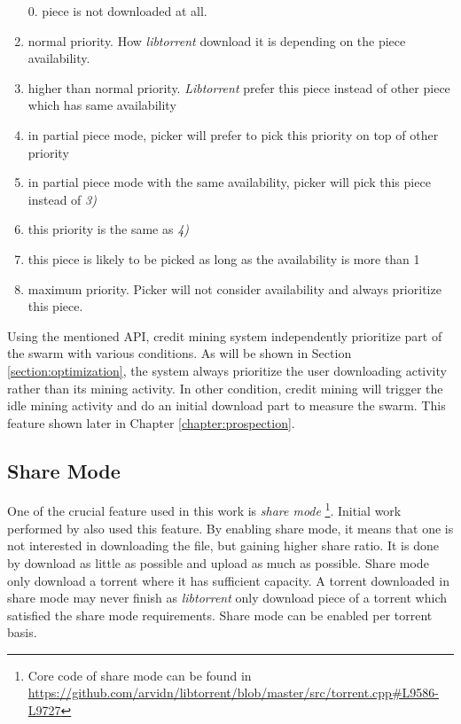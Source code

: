 \begin{enumerate}[topsep=1pt,itemsep=0ex,partopsep=0pt,parsep=2pt]
	\itemsep0em 
	\item[0.] piece is not downloaded at all.
	\item normal priority. How \textit{libtorrent} download it is depending on the piece availability.
	\item higher than normal priority. \textit{Libtorrent} prefer this piece instead of other piece which has same availability
	\item in partial piece mode, picker will prefer to pick this priority on top of other priority
	\item in partial piece mode with the same availability, picker will pick this piece instead of \textit{3)}
	\item this priority is the same as \textit{4)}
	\item this piece is likely to be picked as long as the availability is more than 1
	\item maximum priority. Picker will not consider availability and always prioritize this piece.
\end{enumerate}

Using the mentioned API, credit mining system independently prioritize part of the swarm with various conditions. As will be shown in Section \ref{section:optimization}, the system always prioritize the user downloading activity rather than its mining activity. In other condition, credit mining will trigger the idle mining activity and do an initial download part to measure the swarm. This feature shown later in Chapter \ref{chapter:prospection}. 

\subsection{Share Mode}
\label{section:sharemode}
One of the crucial feature used in this work is \textit{share mode} \footnote{Core code of share mode can be found in \url{https://github.com/arvidn/libtorrent/blob/master/src/torrent.cpp\#L9586-L9727}}. Initial work performed by \citeauthor{2015:creditmining:capota} also used this feature\cite{2015:creditmining:capota}. By enabling share mode, it means that one is not interested in downloading the file, but gaining higher share ratio. It is done by download as little as possible and upload as much as possible. Share mode only download a torrent where it has sufficient capacity. A torrent downloaded in share mode may never finish as \textit{libtorrent} only download piece of a torrent which satisfied the share mode requirements. Share mode can be enabled per torrent basis.

